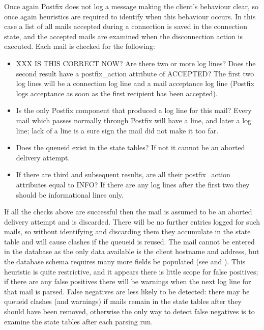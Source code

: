 Once again Postfix does not log a message making the client's behaviour
clear, so once again heuristics are required to identify when this
behaviour occurs.  In this case a list of all mails accepted during a
connection is saved in the connection state, and the accepted mails are
examined when the disconnection action is executed.  Each mail is checked
for the following: 

\begin{itemize}

    \item XXX IS THIS CORRECT NOW\@?\newline{}  Are there two or more
         log lines?  Does the second result have a
        postfix\_action attribute of ACCEPTED\@?  The first two
         log lines will be a connection log line and a mail
        acceptance log line (Postfix logs acceptance as soon as the first
        recipient has been accepted).

    \item Is  the only Postfix component that produced a log
        line for this mail?  Every mail which passes normally through
        Postfix will have a  line, and later a
         log line; lack of a  line is a sure
        sign the mail did not make it too far.  

    \item Does the queueid exist in the state tables?  If not it cannot be
        an aborted delivery attempt.

    \item If there are third and subsequent results, are all their
        postfix\_action attributes equal to INFO\@?  If there are any log
        lines after the first two they should be informational lines only.

\end{itemize}

If all the checks above are successful then the mail is assumed to be an
aborted delivery attempt and is discarded.  There will be no further
entries logged for such mails, so without identifying and discarding them
they accumulate in the state table and will cause clashes if the queueid is
reused.  The mail cannot be entered in the database as the only data
available is the client hostname and \IP{} address, but the database schema
requires many more fields be populated (see 
and ).  This heuristic is quite restrictive, and
it appears there is little scope for false positives; if there are any
false positives there will be warnings when the next log line for that mail
is parsed.  False negatives are less likely to be detected: there may be
queueid clashes (and warnings) if mails remain in the state tables after
they should have been removed, otherwise the only way to detect false
negatives is to examine the state tables after each parsing run.


